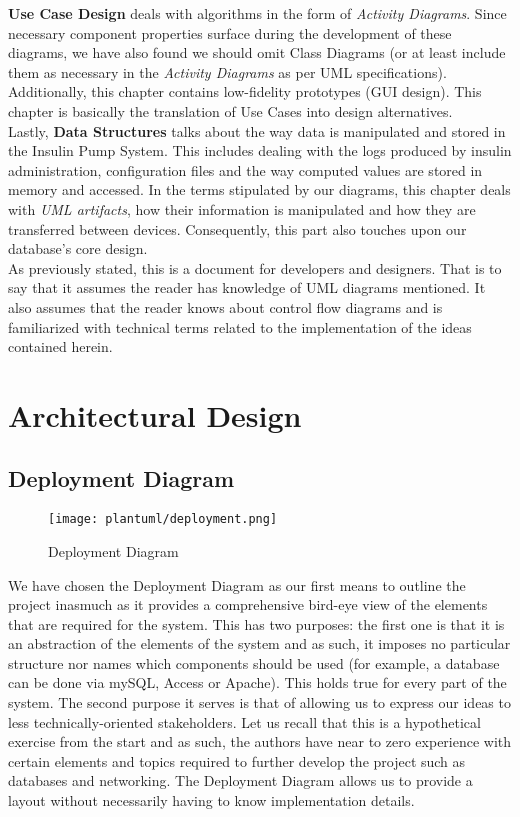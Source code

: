 \documentclass{scrreprt}
\begin{document}
\textbf{Use Case Design} deals with algorithms in the form of \textsl{Activity Diagrams}. Since necessary component properties surface during the development of these diagrams, we have also found we should omit 
Class Diagrams (or at least include them as necessary in the \textsl{Activity Diagrams} as per UML specifications). Additionally, this chapter contains low-fidelity prototypes (GUI design). This chapter is basically the 
translation of Use Cases into design alternatives.\\

Lastly, \textbf{Data Structures} talks about the way data is manipulated and stored in the Insulin Pump System. This includes dealing with the logs produced by insulin administration, configuration files and the way 
computed values are stored in memory and accessed. In the terms stipulated by our diagrams, this chapter deals with \textsl{UML artifacts}, how their information is manipulated and how they are transferred between
devices. Consequently, this part also touches upon our database's core design.\\

As previously stated, this is a document for developers and designers. That is to say that it assumes the reader has knowledge of UML diagrams mentioned. It also assumes that the reader knows about control flow 
diagrams and is familiarized with technical terms related to the implementation of the ideas contained herein.

\chapter{Architectural Design}
\section{Deployment Diagram}
\begin{figure}[h!]
    \centering
    \texttt{[image: plantuml/deployment.png]}
    \caption{Deployment Diagram}
    \label{fig:deploy}
\end{figure}

\clearpage
We have chosen the Deployment Diagram as our first means to outline the project inasmuch as it provides a comprehensive bird-eye view of the elements that are required for the system. This has two purposes: the first one
is that it is an abstraction of the elements of the system and as such, it imposes no particular structure nor names which components should be used (for example, a database can be done via mySQL, Access or Apache). This
holds true for every part of the system. The second purpose it serves is that of allowing us to express our ideas to less technically-oriented stakeholders. Let us recall that this is a hypothetical exercise from the start
and as such, the authors have near to zero experience with certain elements and topics required to further develop the project such as databases and networking. The Deployment Diagram allows us to provide a layout without
necessarily having to know implementation details. 
\end{document}
